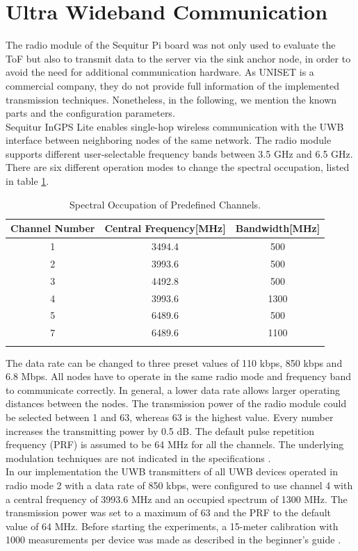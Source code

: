 \section{Ultra Wideband Communication}
The radio module of the Sequitur Pi board was not only used  to evaluate the ToF but also to transmit data to the server via the sink anchor node, in order to avoid the need for additional communication hardware. As UNISET is a commercial company, they do not provide full information of the implemented transmission techniques. Nonetheless, in the following, we mention the known parts and the configuration parameters.\\
\noindent\hspace*{5mm}%
Sequitur InGPS Lite enables single-hop wireless communication with the UWB interface between neighboring nodes of the same network. The radio module supports different user-selectable frequency bands between 3.5 GHz and 6.5 GHz. There are six different operation modes to change the spectral occupation, listed in table \ref{tab:spectral_occupation}.\\
\begin{table}
\caption{Spectral Occupation of Predefined Channels.}
\label{tab:spectral_occupation}
\centering
\begin{tabular}{c c c}
\toprule
\textbf{Channel Number} & \textbf{Central Frequency}[MHz] & \textbf{Bandwidth}[MHz]\\
\midrule
1 & 3494.4 & 500\\
2 & 3993.6 & 500\\
3 & 4492.8 & 500\\
4 & 3993.6 & 1300\\
5 & 6489.6 & 500\\
7 & 6489.6 & 1100\\
\bottomrule\\
\end{tabular}
\end{table}
The data rate can be changed to three preset values of 110 kbps, 850 kbps and 6.8 Mbps. All nodes have to operate in the same radio mode and frequency band to communicate correctly. In general, a lower data rate allows larger operating distances between the nodes. The transmission power of the radio module could be selected between 1 and 63, whereas 63 is the highest value. Every number increases the transmitting power by 0.5 dB. The default pulse repetition frequency (PRF) is assumed to be 64 MHz for all the channels. The underlying modulation techniques are not indicated in the specifications \cite{Usermanual, Beginnersguide}.\\
\noindent\hspace*{5mm}%
In our implementation the UWB transmitters of all UWB devices operated in radio mode 2 with a data rate of 850 kbps, were configured to use channel 4 with a central frequency of 3993.6 MHz and an occupied spectrum of 1300 MHz. The transmission power was set to a maximum of 63 and the PRF to the default value of 64 MHz. Before starting the experiments, a 15-meter calibration with 1000 measurements per device was made as described in the beginner's guide \cite{Beginnersguide}.